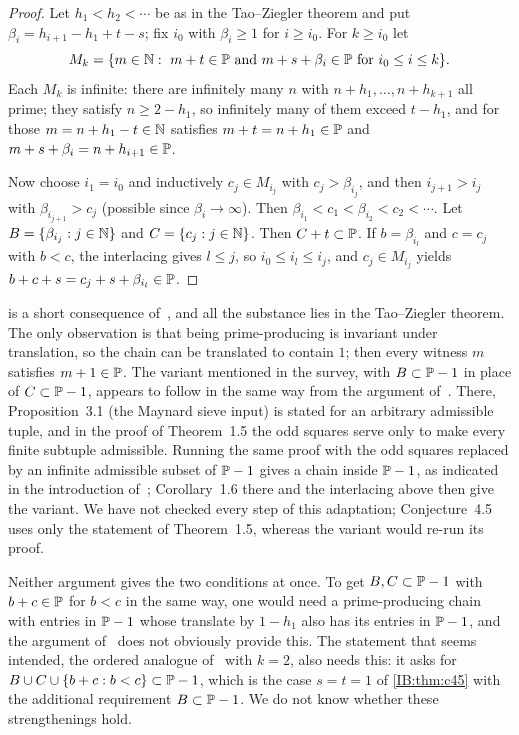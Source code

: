 \begin{proof}
Let $h_1<h_2<\cdots$ be as in the Tao--Ziegler theorem and put
$\beta_i=h_{i+1}-h_1+t-s$; fix $i_0$ with $\beta_i\ge1$ for $i\ge i_0$. For $k\ge i_0$ let
\[
M_k=\{m\in\N:\ m+t\in\P\ \text{and}\ m+s+\beta_i\in\P\ \text{for}\ i_0\le i\le k\}.
\]
Each $M_k$ is infinite: there are infinitely many $n$ with $n+h_1,\dots,n+h_{k+1}$ all
prime; they satisfy $n\ge2-h_1$, so infinitely many of them exceed $t-h_1$, and for
those $m=n+h_1-t\in\N$ satisfies $m+t=n+h_1\in\P$ and $m+s+\beta_i=n+h_{i+1}\in\P$.

Now choose $i_1=i_0$ and inductively $c_j\in M_{i_j}$ with $c_j>\beta_{i_j}$, and then
$i_{j+1}>i_j$ with $\beta_{i_{j+1}}>c_j$ (possible since $\beta_i\to\infty$). Then
$\beta_{i_1}<c_1<\beta_{i_2}<c_2<\cdots$. Let $B=\{\beta_{i_j}:j\in\N\}$ and $C=\{c_j:j\in\N\}$. Then
$C+t\subset\P$. If $b=\beta_{i_l}$ and $c=c_j$ with $b<c$, the interlacing gives $l\le j$, so
$i_0\le i_l\le i_j$, and $c_j\in M_{i_j}$ yields $b+c+s=c_j+s+\beta_{i_l}\in\P$.
\end{proof}


\begin{remark}
\label{IB:rem:c45}
 is a short consequence of~\cite[Theorem~1.5]{tao2023infinite}, and
all the substance lies in the Tao--Ziegler theorem. The only observation is that
being prime-producing is invariant under translation, so the chain can be
translated to contain $1$; then every witness $m$ satisfies $m+1\in\P$. The
variant mentioned in the survey, with $B\subset\P-1$ in place of $C\subset\P-1$, appears to
follow in the same way from the argument of~\cite{tao2023infinite}. There,
Proposition~3.1 (the Maynard sieve input) is stated for an arbitrary admissible
tuple, and in the proof of Theorem~1.5 the odd squares serve only to make every
finite subtuple admissible. Running the same proof with the odd squares replaced
by an infinite admissible subset of $\P-1$ gives a chain inside $\P-1$, as
indicated in the introduction of~\cite{tao2023infinite}; Corollary~1.6 there and
the interlacing above then give the variant. We have not checked every step of this adaptation;
Conjecture~4.5 uses only the statement of Theorem~1.5, whereas the variant would re-run its
proof.

Neither argument gives the two conditions at once. To get $B,C\subset\P-1$ with
$b+c\in\P$ for $b<c$ in the same way, one would need a prime-producing chain with
entries in $\P-1$ whose translate by $1-h_1$ also has its entries in $\P-1$, and
the argument of~\cite{tao2023infinite} does not obviously provide this. The
statement that seems intended, the ordered analogue of~\cite[Conjecture~4.3]{kra2023problems}
with $k=2$, also needs this: it asks for $B\cup C\cup\{b+c:b<c\}\subset\P-1$, which is the
case $s=t=1$ of \cref{IB:thm:c45} with the additional requirement $B\subset\P-1$. We do not
know whether these strengthenings hold.
\end{remark}
